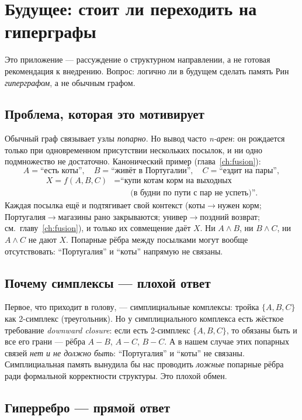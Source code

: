 \chapter{Будущее: стоит ли переходить на гиперграфы}
\label{ch:hypergraphs}

Это приложение --- рассуждение о структурном направлении, а не готовая
рекомендация к внедрению. Вопрос: логично ли в будущем сделать память Рин
\emph{гиперграфом}, а не обычным графом.

\section{Проблема, которая это мотивирует}

Обычный граф связывает узлы \emph{попарно}. Но вывод часто \emph{n-арен}: он
рождается только при одновременном присутствии нескольких посылок, и ни одно
подмножество не достаточно. Канонический пример (глава~\ref{ch:fusion}):
\[
A=\text{``есть коты''},\quad B=\text{``живёт в Португалии''},\quad
C=\text{``ездит на пары''},
\]
\[
\begin{aligned}
X=f(A,B,C)
&=\text{``купи котам корм на выходных}\\
&\qquad \text{(в будни по пути с пар не успеть)''}.
\end{aligned}
\]
Каждая посылка ещё и подтягивает свой контекст (коты$\to$нужен корм;
Португалия$\to$магазины рано закрываются; универ$\to$поздний возврат;
см.\ главу~\ref{ch:fusion}), и только их совмещение даёт $X$. Ни $A\wedge B$,
ни $B\wedge C$, ни $A\wedge C$ не дают $X$. Попарные рёбра между посылками
могут вообще отсутствовать: ``Португалия'' и ``коты'' напрямую не связаны.

\section{Почему симплексы --- плохой ответ}

Первое, что приходит в голову, --- симплициальные комплексы: тройка
$\{A,B,C\}$ как 2-симплекс (треугольник). Но у симплициального комплекса
есть жёсткое требование \emph{downward closure}: если есть 2-симплекс
$\{A,B,C\}$, то обязаны быть и все его грани --- рёбра $A-B$, $A-C$, $B-C$.
А в нашем случае этих попарных связей \emph{нет и не должно быть}:
``Португалия'' и ``коты'' не связаны. Симплициальная память вынудила бы нас
проводить \emph{ложные} попарные рёбра ради формальной корректности
структуры. Это плохой обмен.

\section{Гиперребро --- прямой ответ}

